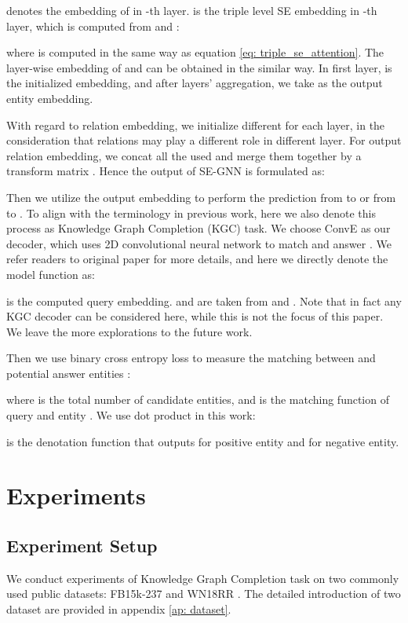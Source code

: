 \documentclass[letterpaper]{article} \usepackage{aaai22}  \usepackage{times}  \usepackage{helvet}  \usepackage{courier}  \usepackage[hyphens]{url}  \usepackage{graphicx} \urlstyle{rm} \def\UrlFont{\rm}  \usepackage{natbib}  \usepackage{caption} \DeclareCaptionStyle{ruled}{labelfont=normalfont,labelsep=colon,strut=off} \frenchspacing  \setlength{\pdfpagewidth}{8.5in}  \setlength{\pdfpageheight}{11in}  \usepackage{algorithm}
\begin{document}
 denotes the embedding of  in -th layer.  is the triple level SE embedding in -th layer, which is computed from  and : 

where  is computed in the same way as equation \ref{eq: triple_se_attention}. The layer-wise embedding of  and  can be obtained in the similar way. 
In first layer,  is the initialized embedding, and after  layers' aggregation, we take  as the output entity embedding.

With regard to relation embedding, we initialize different  for each layer, in the consideration that relations may play a different role in different layer.  
For output relation embedding, we concat all the  used and merge them together by a transform matrix . Hence the output of SE-GNN is formulated as:  


Then we utilize the output embedding to perform the prediction from  to  or from  to . To align with the terminology in previous work, here we also denote this process as Knowledge Graph Completion (KGC) task. 
We choose ConvE \cite{AAAI_2018_Dettmers_ConvE_WN18RR} as our decoder, which uses 2D convolutional neural network to match  and answer . We refer readers to original paper for more details, and here we directly denote the model function as:
 
 is the computed query embedding.  and  are taken from  and .
Note that in fact any KGC decoder can be considered here, while this is not the focus of this paper. We leave the more explorations to the future work. 

Then we use binary cross entropy loss to measure the matching between  and potential answer entities : 

where  is the total number of candidate entities, and  is the matching function of query  and entity . We use dot product in this work: 

 is the denotation function that outputs  for positive entity and  for negative entity. 

\section{Experiments}

\subsection{Experiment Setup}
\label{sec: experiment setup}
We conduct experiments of Knowledge Graph Completion task on two commonly used public datasets: FB15k-237 \cite{2015_Toutanova_FB15k-237} and WN18RR \cite{AAAI_2018_Dettmers_ConvE_WN18RR}. The detailed introduction of two dataset are provided in appendix \ref{ap: dataset}.
\end{document}
